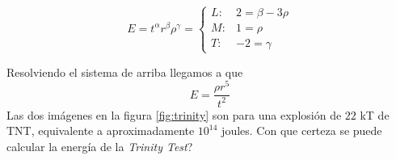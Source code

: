 \begin{equation*}
	E = t^\alpha r^\beta \rho^\gamma = \begin{cases}
	L:& 2=\beta - 3\rho \\
	M:& 1= \rho \\
	T:& -2 = \gamma
	\end{cases}  
\end{equation*}

Resolviendo el sistema de arriba llegamos a que 
\[E = \frac{\rho r^{5}}{t^{2}} \]
Las dos imágenes en la figura \ref{fig:trinity} son para una explosión de $22$ kT de TNT, equivalente a aproximadamente $10 ^{14}$ joules. Con que certeza se puede calcular la energía de la \textit{Trinity Test}? 







